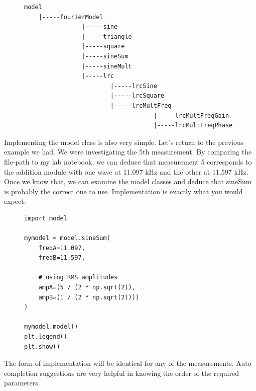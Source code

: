 \documentclass{article}
\begin{document}
\begin{figure}[H]
\centering
\begin{minipage}{1\textwidth}
\begin{tcolorbox}
\begin{verbatim}
model
    |-----fourierModel
                |-----sine
                |-----triangle
                |-----square
                |-----sineSum
                |-----sineMult
                |-----lrc
                        |-----lrcSine
                        |-----lrcSquare
                        |-----lrcMultFreq
                                    |-----lrcMultFreqGain
                                    |-----lrcMultFreqPhase
\end{verbatim}
\end{tcolorbox}
\end{minipage}
\end{figure}

Implementing the model class is also very simple. Let's return to the previous
example we had. We were investigating the 5th measurement. By comparing the
file-path to my lab notebook, we can deduce that measurement 5 corresponds to
the addition module with one wave at 11.097 kHz and the other at 11.597 kHz.
Once we know that, we can examine the model classes and deduce that sineSum is
probably the correct one to use. Implementation is exactly what you would
expect:
\begin{figure}[H]
\centering
\begin{minipage}{1\textwidth}
\begin{tcolorbox}
\begin{verbatim}
import model

mymodel = model.sineSum(
    freqA=11.097, 
    freqB=11.597, 

    # using RMS amplitudes
    ampA=(5 / (2 * np.sqrt(2)), 
    ampB=(1 / (2 * np.sqrt(2))))
)

mymodel.model()
plt.legend()
plt.show()
\end{verbatim}
\end{tcolorbox}
\end{minipage}
\end{figure}

The form of implementation will be identical for any of the measurements.
Auto completion suggestions are very helpful in knowing the order of the
required parameters.
\end{document}
